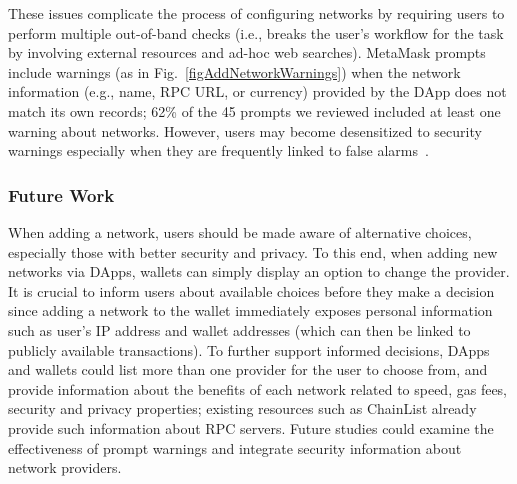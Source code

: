 \documentclass[conference]{IEEEtran}
\begin{document}
These issues complicate the process of configuring networks by requiring users to perform multiple out-of-band checks (i.e., breaks the user's workflow for the task by involving external resources and ad-hoc web searches).
MetaMask prompts include warnings (as in Fig.~\ref{figAddNetworkWarnings}) when the network information (e.g., name, RPC URL, or currency) provided by the DApp does not match its own records; 62\% of the 45 prompts we reviewed included at least one warning about networks.
However, users may become desensitized to security warnings especially when they are frequently linked to false alarms~\cite{krol2012Dont}.

\subsubsection*{\textbf{Future Work}}
When adding a network, users should be made aware of alternative choices, especially those with better security and privacy.
To this end, when adding new networks via DApps, wallets can simply display an option to change the provider. %
It is crucial to inform users about available choices before they make a decision since adding a network to the wallet immediately exposes personal information such as user's IP address and wallet addresses (which can then be linked to publicly available transactions).
To further support informed decisions, DApps and wallets could list more than one provider for the user to choose from, and provide information about the benefits of each network related to speed, gas fees, security and privacy properties; existing resources such as ChainList already provide such information about \ac*{RPC} servers. %
Future studies could examine the effectiveness of prompt warnings and integrate security information about network providers.

\end{document}
